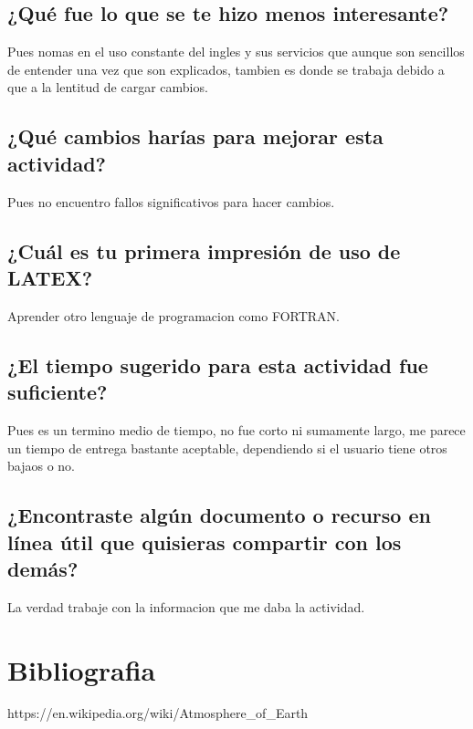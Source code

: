 \documentclass{article}
\begin{document}
\subsection{¿Qué fue lo que se te hizo menos interesante?}
Pues nomas en el uso constante del ingles y sus servicios que aunque son sencillos de entender una vez que son explicados, tambien es donde se trabaja debido a que a la lentitud de cargar cambios.
\subsection{¿Qué cambios harías para mejorar esta actividad?}
Pues no encuentro fallos significativos para hacer cambios.
\subsection{¿Cuál es tu primera impresión de uso de LATEX?}
Aprender otro lenguaje de programacion como FORTRAN.
\subsection{¿El tiempo sugerido para esta actividad fue suficiente?}
Pues es un termino medio de tiempo, no fue corto ni sumamente largo, me parece un tiempo de entrega bastante aceptable, dependiendo si el usuario tiene otros bajaos o no.
\subsection{¿Encontraste algún documento o recurso en línea útil que quisieras compartir con los demás?}
La verdad trabaje con la informacion que me daba la actividad.
\section{Bibliografia}
https://en.wikipedia.org/wiki/Atmosphere\_of\_Earth
\end{document}
